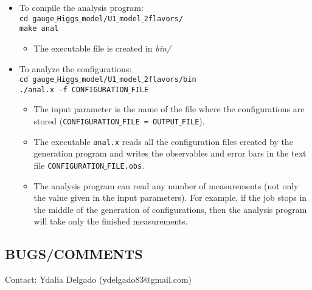 \documentclass[a4paper,10pt]{report}
\begin{document}
\begin{itemize}[leftmargin=*]
 \newpage
 \item To compile the analysis program:
 \vspace*{2mm}
 \texttt{
 \\cd gauge$\_$Higgs$\_$model/U1$\_$model$\_$2flavors/
 \\make anal
 }

 \begin{itemize}[leftmargin=*]
  \item The executable file is created in {\it bin/}
 \end{itemize}
 
 \item To analyze the configurations:
 \vspace*{2mm}
 \texttt{
 \\cd gauge$\_$Higgs$\_$model/U1$\_$model$\_$2flavors/bin
 \\./anal.x -f CONFIGURATION$\_$FILE
 }

 \begin{itemize}[leftmargin=*]
  \item The input parameter is the name of the file where the configurations are stored 
  ({\tt CONFIGURATION$\_$FILE = OUTPUT$\_$FILE}).
  \item The executable {\tt anal.x} reads all the configuration files created by the generation program 
  and writes the observables and error bars in the text file {\tt CONFIGURATION$\_$FILE.obs}.
  \item The analysis program can read any number of measurements (not only the value given in the input parameters).
  For example, if the job stops in the middle of the generation of configurations, then the analysis program will take
  only the finished measurements.
 \end{itemize}
\end{itemize}


\subsection*{BUGS/COMMENTS}
Contact: Ydalia Delgado (ydelgado83@gmail.com)
\end{document}
